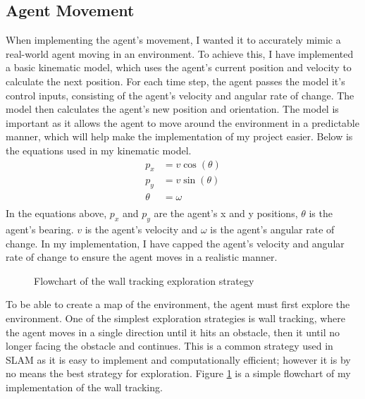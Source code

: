 \documentclass[12pt]{article}
\begin{document}
\subsection{Agent Movement}
When implementing the agent's movement, I wanted it to accurately mimic a real-world agent moving in an environment. To achieve this,
I have implemented a basic kinematic model, which uses the agent's current position and velocity to calculate the next position. For
each time step, the agent passes the model it's control inputs, consisting of the agent's velocity and angular rate of change. The model
then calculates the agent's new position and orientation. The model is important as it allows the agent to move around the environment
in a predictable manner, which will help make the implementation of my project easier. Below is the equations used in my kinematic model. \\
\begin{equation}
    \begin{aligned}
        p_x &= v \cos(\theta) \\
        p_y &= v \sin(\theta) \\
        \theta &= \omega \\
    \end{aligned}
\end{equation}
In the equations above, \(p_x\) and \(p_y\) are the agent's x and y positions, \(\theta\) is the agent's bearing. \(v\) is the agent's velocity
and \(\omega\) is the agent's angular rate of change. In my implementation, I have capped the agent's velocity and angular rate of change
to ensure the agent moves in a realistic manner.\\
\begin{figure}[H]
    \centering
    \caption{Flowchart of the wall tracking exploration strategy}
    \label{fig:wall_tracking_flowchart}
\end{figure}
To be able to create a map of the environment, the agent must first explore the environment. One of the simplest exploration strategies
is wall tracking, where the agent moves in a single direction until it hits an obstacle, then it until no longer facing the obstacle and continues.
This is a common strategy used in SLAM as it is easy to implement and computationally efficient; however it is by no means the best strategy
for exploration. Figure \ref{fig:wall_tracking_flowchart} is a simple flowchart of my implementation of the wall tracking.\\
\end{document}
